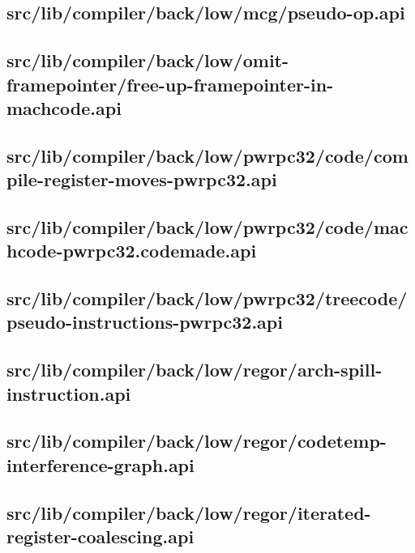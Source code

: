 \subsection{src/lib/compiler/back/low/mcg/pseudo-op.api}


\subsection{src/lib/compiler/back/low/omit-framepointer/free-up-framepointer-in-machcode.api}


\subsection{src/lib/compiler/back/low/pwrpc32/code/compile-register-moves-pwrpc32.api}


\subsection{src/lib/compiler/back/low/pwrpc32/code/machcode-pwrpc32.codemade.api}


\subsection{src/lib/compiler/back/low/pwrpc32/treecode/pseudo-instructions-pwrpc32.api}


\subsection{src/lib/compiler/back/low/regor/arch-spill-instruction.api}


\subsection{src/lib/compiler/back/low/regor/codetemp-interference-graph.api}


\subsection{src/lib/compiler/back/low/regor/iterated-register-coalescing.api}


